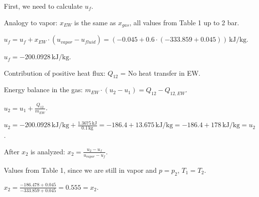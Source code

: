 First, we need to calculate \( u_f \).  

Analogy to vapor: \( x_{EW} \) is the same as \( x_{gas} \), all values from Table 1 up to 2 bar.  

\( u_f = u_f + x_{EW} \cdot (u_{vapor} - u_{fluid}) = (-0.045 + 0.6 \cdot (-333.859 + 0.045)) \, \text{kJ/kg} \).  

\( u_f = -200.0928 \, \text{kJ/kg} \).  

Contribution of positive heat flux:  
\( Q_{12} \) = No heat transfer in EW.  

Energy balance in the gas:  
\( m_{EW} \cdot (u_2 - u_1) = Q_{12} - Q_{12,EW} \).  

\( u_2 = u_1 + \frac{Q_{12}}{m_{EW}} \).  

\( u_2 = -200.0928 \, \text{kJ/kg} + \frac{1.3675 \, \text{kJ}}{0.1 \, \text{kg}} = -186.4 + 13.675 \, \text{kJ/kg} = -186.4 + 178 \, \text{kJ/kg} = u_2 \).  

After \( x_2 \) is analyzed:  
\( x_2 = \frac{u_2 - u_f}{u_{vapor} - u_f} \).  

Values from Table 1, since we are still in vapor and \( p = p_2 \), \( T_1 = T_2 \).  

\( x_2 = \frac{-186.478 + 0.045}{-333.859 + 0.045} = 0.555 = x_2 \).